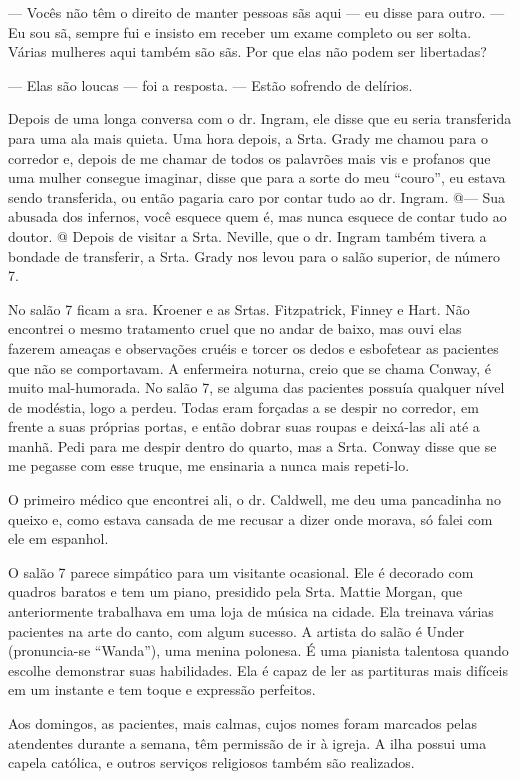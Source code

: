 --- Vocês não têm o direito de manter pessoas sãs aqui --- eu disse para
outro. --- Eu sou sã, sempre fui e insisto em receber um exame completo
ou ser solta. Várias mulheres aqui também são sãs. Por que elas não
podem ser libertadas?

--- Elas são loucas --- foi a resposta. --- Estão sofrendo de delírios.

Depois de uma longa conversa com o dr. Ingram, ele disse que eu seria
transferida para uma ala mais quieta. Uma hora depois, a Srta. Grady me
chamou para o corredor e, depois de me chamar de todos os palavrões mais
vis e profanos que uma mulher consegue imaginar, disse que para a sorte
do meu ``couro'', eu estava sendo transferida, ou então pagaria caro por
contar tudo ao dr. Ingram. @--- Sua abusada dos infernos, você esquece
quem é, mas nunca esquece de contar tudo ao doutor. @ Depois de visitar
a Srta. Neville, que o dr. Ingram também tivera a bondade de transferir,
a Srta. Grady nos levou para o salão superior, de número 7.

No
salão 7 ficam a sra. Kroener e as Srtas. Fitzpatrick, Finney e Hart. Não
encontrei o mesmo tratamento cruel que no andar de baixo, mas ouvi elas
fazerem ameaças e observações cruéis e torcer os dedos e esbofetear as
pacientes que não se comportavam. A enfermeira noturna, creio que se
chama Conway, é muito mal-humorada. No salão 7, se alguma das pacientes
possuía qualquer nível de modéstia, logo a perdeu. Todas eram forçadas a
se despir no corredor, em frente a suas próprias portas, e então dobrar
suas roupas e deixá-las ali até a manhã. Pedi para me despir dentro do
quarto, mas a Srta. Conway disse que se me pegasse com esse truque, me
ensinaria a nunca mais repeti-lo.

O primeiro médico que encontrei ali, o dr. Caldwell, me deu uma
pancadinha no queixo e, como estava cansada de me recusar a dizer onde
morava, só falei com ele em espanhol.

O salão 7 parece simpático para um visitante ocasional. Ele é decorado
com quadros baratos e tem um piano, presidido pela Srta. Mattie Morgan,
que anteriormente trabalhava em uma loja de música na cidade. Ela
treinava várias pacientes na arte do canto, com algum sucesso. A artista
do salão é Under (pronuncia-se ``Wanda''), uma menina polonesa. É uma
pianista talentosa quando escolhe demonstrar suas habilidades. Ela é
capaz de ler as partituras mais difíceis em um instante e tem toque e
expressão perfeitos.

Aos domingos, as pacientes, mais calmas, cujos nomes foram marcados
pelas atendentes durante a semana, têm permissão de ir à igreja. A ilha
possui uma capela católica, e outros serviços religiosos também são
realizados.

